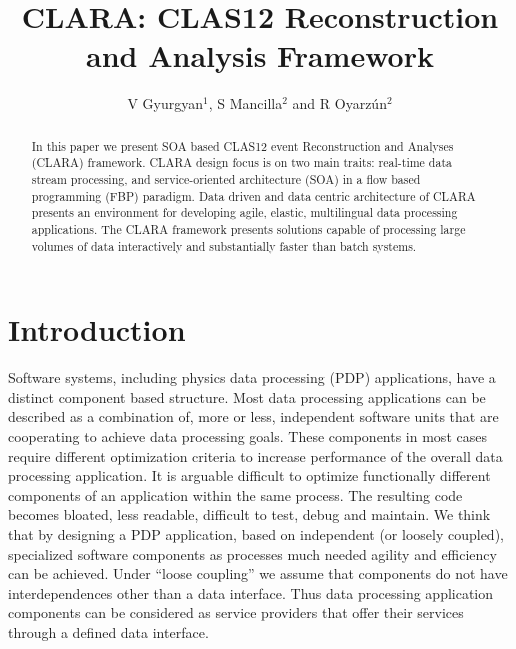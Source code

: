 \documentclass[a4paper]{jpconf}
\begin{document}
\title{CLARA: CLAS12 Reconstruction and Analysis Framework}

\author{V Gyurgyan$^1$, S Mancilla$^2$ and R Oyarz\'un$^2$}
\address{$ˆ1$ Thomas Jefferson National Accelerator Facility, Newport News, VA, USA}
\address{$ˆ2$ Universidad T\'ecnica Federico Santa Mar\'ia, Valpara\'iso, Chile}



\begin{abstract}
  In this paper we present SOA based
  CLAS12 event Reconstruction and Analyses (CLARA) framework.
  CLARA design focus is on two main traits:
  real-time data stream processing,
  and service-oriented architecture (SOA)
  in a flow based programming (FBP) paradigm.
  Data driven and data centric architecture of CLARA presents an environment
  for developing agile, elastic, multilingual data processing applications.
  The CLARA framework presents solutions
  capable of processing large volumes of data interactively
  and substantially faster than batch systems.
\end{abstract}

\section{Introduction}

Software systems,
including physics data processing (PDP) applications,
have a distinct component based structure.
Most data processing applications can be described
as a combination of, more or less, independent software units
that are cooperating to achieve data processing goals.
These components in most cases require different optimization criteria
to increase performance of the overall data processing application.
It is arguable difficult to optimize functionally different components
of an application within the same process.
The resulting code becomes bloated,
less readable, difficult to test, debug and maintain.
We think that by designing a PDP application,
based on independent (or loosely coupled), specialized software components as processes
much needed agility and efficiency can be achieved.
Under ``loose coupling'' we assume that
components do not have interdependences other than a data interface.
Thus data processing application components can be considered
as service providers that offer their services through a defined data interface.
\end{document}
